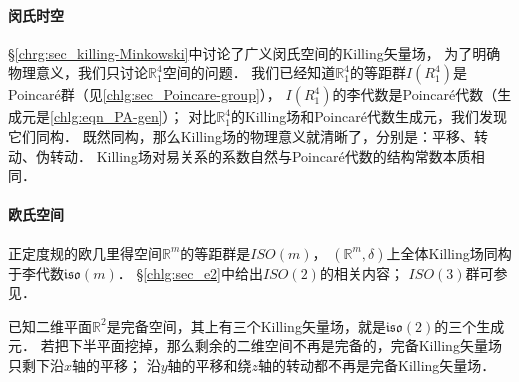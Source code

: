 



\paragraph{闵氏时空}
\S\ref{chrg:sec_killing-Minkowski}中讨论了广义闵氏空间的Killing矢量场，
为了明确物理意义，我们只讨论$\mathbb{R}^4_1$空间的问题．
我们已经知道$\mathbb{R}^4_1$的等距群$I({R}^4_1)$是Poincar\'{e}群（见\ref{chlg:sec_Poincare-group}），
$I({R}^4_1)$的李代数是Poincar\'{e}代数（生成元是\eqref{chlg:eqn_PA-gen}）；
对比$\mathbb{R}^4_1$的Killing场和Poincar\'{e}代数生成元，我们发现它们同构．
既然同构，那么Killing场的物理意义就清晰了，分别是：平移、转动、伪转动．
Killing场对易关系的系数自然与Poincar\'{e}代数的结构常数本质相同．



\paragraph{欧氏空间}
正定度规的欧几里得空间$\mathbb{R}^m$的等距群是$ISO(m)$，
$(\mathbb{R}^m,\delta)$上全体Killing场同构于李代数$\mathfrak{iso}(m)$．
\S\ref{chlg:sec_e2}中给出$ISO(2)$的相关内容；
$ISO(3)$群可参见\parencite[\S 9.6]{tung-1985}．


\begin{example}\label{chlg:exm_incomplete-iso2}
    已知二维平面$\mathbb{R}^2$是完备空间，其上有三个Killing矢量场，就是$\mathfrak{iso}(2)$的三个生成元．
    若把下半平面挖掉，那么剩余的二维空间不再是完备的，完备Killing矢量场只剩下沿$x$轴的平移；
    沿$y$轴的平移和绕$z$轴的转动都不再是完备Killing矢量场．
\end{example}


